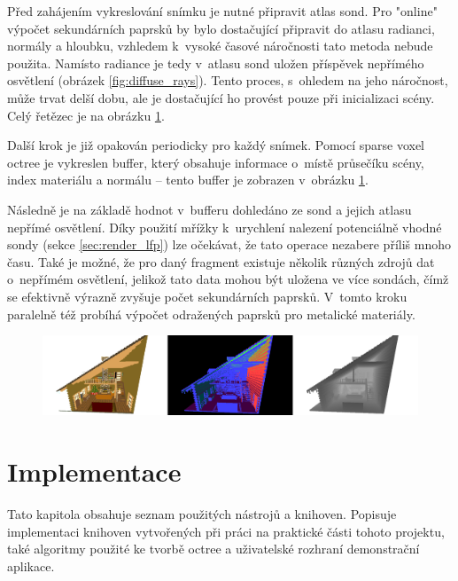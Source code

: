 Před zahájením vykreslování snímku je nutné připravit atlas sond. Pro "online" výpočet sekundárních paprsků by bylo dostačující připravit do atlasu radianci, normály a hloubku, vzhledem k~vysoké časové náročnosti tato metoda nebude použita. Namísto radiance je tedy v~atlasu sond uložen příspěvek nepřímého osvětlení (obrázek \ref{fig:diffuse_rays}). Tento proces, s~ohledem na jeho náročnost, může trvat delší dobu, ale je dostačující ho provést pouze při inicializaci scény. Celý řetězec je na obrázku \ref{fig:gbuffer_contents}.

Další krok je již opakován periodicky pro každý snímek. Pomocí sparse voxel octree je vykreslen buffer, který obsahuje informace o~místě průsečíku scény, index materiálu a normálu -- tento buffer je zobrazen v~obrázku \ref{fig:gbuffer_contents}.

Následně je na základě hodnot v~bufferu dohledáno ze sond a jejich atlasu nepřímé osvětlení. Díky použití mřížky k~urychlení nalezení potenciálně vhodné sondy (sekce \ref{sec:render_lfp}) lze očekávat, že tato operace nezabere příliš mnoho času. Také je možné, že pro daný fragment existuje několik různých zdrojů dat o~nepřímém osvětlení, jelikož tato data mohou být uložena ve více sondách, čímž se efektivně výrazně zvyšuje počet sekundárních paprsků. V~tomto kroku paralelně též probíhá výpočet odražených paprsků pro metalické materiály.


\begin{figure}[H]
	\centering
	\includegraphics[scale=1]{images/gbuffer_render.png}
	\captionsetup{justification=centering}
	\label{fig:gbuffer_contents}
\end{figure}


\chapter{Implementace}
\label{implementace}

Tato kapitola obsahuje seznam použitých nástrojů a knihoven. Popisuje implementaci knihoven vytvořených při práci na praktické části tohoto projektu, také algoritmy použité ke tvorbě octree a uživatelské rozhraní demonstrační aplikace.

